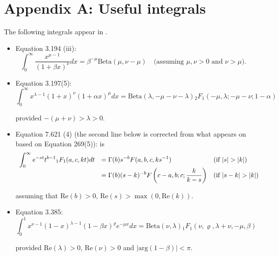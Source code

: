 \newpage 

\section*{Appendix A: Useful integrals}

The following integrals appear in \cite{Gradshteyn2007}.
\begin{itemize}
\item 
Equation 3.194 (iii):
$$
\int_0^\infty \frac{ x^{\mu - 1} }{(1 + \beta x)^\nu} dx = \beta^{-\mu} \mbox{Beta}(\mu,\nu - \mu) \quad   \mbox{(assuming $\mu,\nu>0$ and $\nu>\mu$).}
$$

 




\item  Equation 3.197(5):
$$
\int_0^\infty x^{\lambda - 1}(1 + x)^\nu (1 + \alpha x)^\mu dx
=\mbox{Beta}(\lambda,-\mu-\nu-\lambda){}_2F_1(-\mu,\lambda;-\mu-\nu; 1 - \alpha)
$$

\noindent provided $-(\mu  + \nu) > \lambda > 0$.
 

\item Equation 7.621 (4) 
(the second line below is corrected from what appears on \cite{Gradshteyn2007} based on 
\cite{Erdelyi1953} Equation 269(5)):
is
$$
\begin{array}{rll}
\displaystyle \int_0^\infty e^{-st} t^{b-1} {}_1F_1(a,c,kt) dt
& \displaystyle = \Gamma(b)s^{-b} F(a,b,c,k s^{-1}) 
& \mbox{(if $|s| > |k|$)}
\\
& \displaystyle = \Gamma(b)(s - k)^{-b} F\left(c - a, b; c; \frac{k}{k - s} \right)
& \mbox{(if $|s - k| > |k|$)}
\end{array} 
$$

\noindent assuming that $\mbox{Re}(b)>0$, $\mbox{Re}(s) > \max(0,\mbox{Re}(k))$.

\item Equation 3.385:
\begin{equation} \label{res:04}
\int_{0}^1 x^{\nu - 1} (1 - x)^{\lambda - 1}(1 - \beta x)^{\varrho} e^{-\mu x} dx 
= \mbox{Beta}(\nu,\lambda) {}_1 F_1(\nu,\varrho,\lambda+\nu,-\mu,\beta)
\end{equation}

\noindent provided $\mbox{Re}(\lambda)>0$, $\mbox{Re}(\nu)>0$ and $|\mbox{arg}(1-\beta)|<\pi$.





 

\end{itemize}

